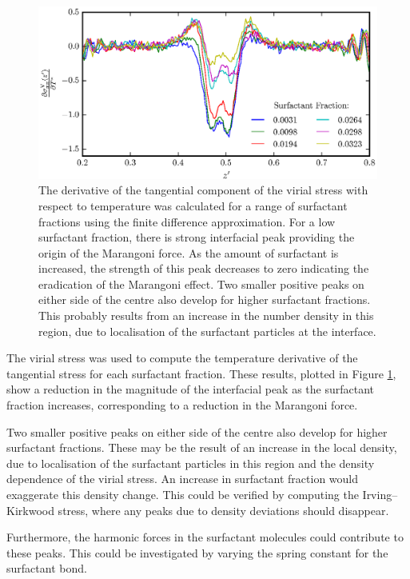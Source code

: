 \begin{figure}[h!]
\centering
\includegraphics[scale=1.0]{SurfForce}
\caption{The derivative of the tangential component of the virial stress with respect to temperature was calculated for a range of surfactant fractions using the finite difference approximation.
For a low surfactant fraction, there is strong interfacial peak providing the origin of the Marangoni force.
As the amount of surfactant is increased, the strength of this peak decreases to zero indicating the eradication of the Marangoni effect.
Two smaller positive peaks on either side of the centre also develop for higher surfactant fractions.
This probably results from an increase in the number density in this region, due to localisation of the surfactant particles at the interface.
}
\label{SurfForce}
\end{figure}

The virial stress was used to compute the temperature derivative of the tangential stress for each surfactant fraction.
These results, plotted in Figure \ref{SurfForce}, show a reduction in the magnitude of the interfacial peak as the surfactant fraction increases, corresponding to a reduction in the Marangoni force.

Two smaller positive peaks on either side of the centre also develop for higher surfactant fractions.
These may be the result of an increase in the local density, due to localisation of the surfactant particles in this region and the density dependence of the virial stress.
An increase in surfactant fraction would exaggerate this density change.
This could be verified by computing the Irving--Kirkwood stress, where any peaks due to density deviations should disappear.

Furthermore, the harmonic forces in the surfactant molecules could contribute to these peaks.
This could be investigated by varying the spring constant for the surfactant bond.
\FloatBarrier

